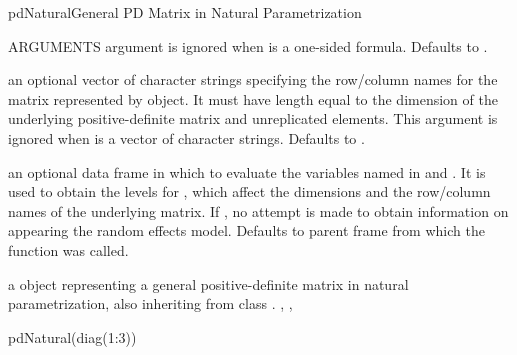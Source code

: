 \documentclass[pdftex]{article} \usepackage{url,graphicx}
\begin{document}
\begin{Helpfile}{pdNatural}{General PD Matrix in Natural Parametrization}
\begin{Argument}{ARGUMENTS}
argument is ignored when  is a one-sided
formula. Defaults to .
\item[\Co{nam:}]
an optional vector of character strings specifying the
row/column names for the matrix represented by object. It must have 
length equal to the dimension of the underlying positive-definite
matrix and unreplicated elements. This argument is ignored when
 is a vector of character strings. Defaults to
.
\item[\Co{data:}]
an optional data frame in which to evaluate the variables
named in  and . It is used to
obtain the levels for , which affect the
dimensions and the row/column names of the underlying matrix. If
, no attempt is made to obtain information on 
 appearing the random effects model. Defaults to parent
frame from which the function was called.
\end{Argument}
a  object representing a general positive-definite
matrix in natural parametrization, also inheriting from class
.
, ,
\need 15pt
\vspace{-16pt} 
\begin{Example}
pdNatural(diag(1:3))
\end{Example}
\end{Helpfile}
\end{document}
